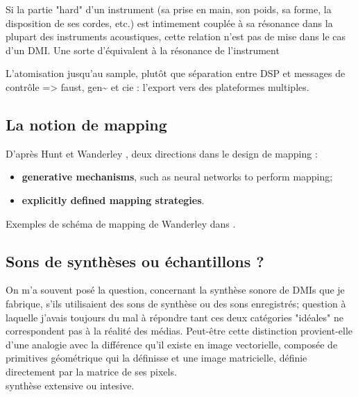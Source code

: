 Si la partie "hard" d'un instrument (sa prise en main, son poids, sa forme, la disposition de ses cordes, etc.) est intimement couplée à sa résonance dans la plupart des instruments acoustiques, cette relation n'est pas de mise dans le cas d'un DMI. Une sorte d'équivalent à la résonance de l'instrument 


L’atomisation jusqu’au sample, plutôt que séparation entre DSP et messages de contrôle
=> faust, gen\textasciitilde{ } et cie : l’export vers des plateformes multiples.

\subsection{La notion de mapping}

 \cite{hunt_towards_2000}

D'après Hunt et Wanderley \cite{hunt_mapping_2002}, deux directions dans le design de mapping :
\vspace{-1em}
\begin{itemize}[noitemsep]
	\item \textbf{generative mechanisms}, such as neural networks to perform mapping;
	\item \textbf{explicitly defined mapping strategies}.
\end{itemize}

Exemples de schéma de mapping de Wanderley dans \cite{wanderley_escher-modeling_1998}.

\subsection{Sons de synthèses ou échantillons ?}

On m'a souvent posé la question, concernant la synthèse sonore de DMIs que je fabrique, s'ils utilisaient des sons de synthèse ou des sons enregistrés; question à laquelle j'avais toujours du mal à répondre tant ces deux catégories "idéales" ne correspondent pas à la réalité des médias. 
Peut-être cette distinction provient-elle d'une analogie avec la différence qu'il existe en image vectorielle, composée de primitives géométrique qui la définisse et une image matricielle, définie directement par la matrice de ses pixels.\\
synthèse extensive ou intesive.


